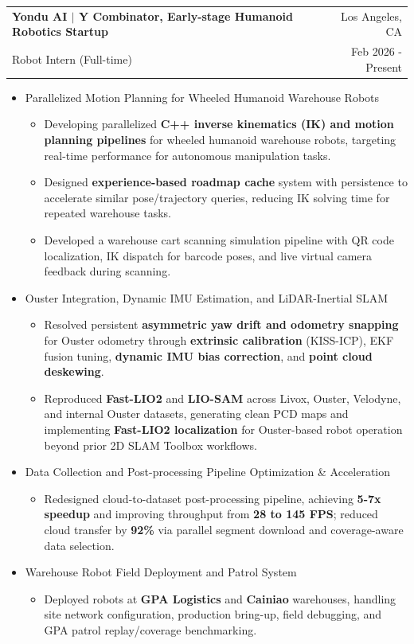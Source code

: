 \documentclass[a4paper,20pt]{article}
\makeatletter
\newcommand{\resumeResearchSubheadingShort}[4]{
  \vspace{4pt}\item
    \begin{tabular*} {0.98\textwidth} {@{\hspace{-0.5em}}l@{\extracolsep{\fill}}r@{}}
      \textbf{#1} & {#2}\null \\
      {#3} & {#4}
    \end{tabular*}
  \vspace{-6pt}
}
\newcommand{\resumeResearchItemListStart}{
  \begin{itemize} [leftmargin=*]
}
\newcommand{\resumeResearchItemListEnd}{
  \end{itemize}
  \vspace{-5pt}
}
\newcommand{\resumeResearchItem}[1]{
  \item{
    {#1 \vspace{-1pt}}
  }
}
\newcommand{\resumeResearchMidItemListStart}{
  \begin{itemize} [leftmargin=*]
}
\newcommand{\resumeResearchMidItemListEnd}{
  \end{itemize}
  \vspace{-8pt}
}
\newcommand{\resumeResearchMidItem}[2]{
  \item{
    \textbf{#1}
    {#2 \vspace{-2pt}}
  }
}
\makeatother
\begin{document}
\resumeResearchSubheadingShort
{Yondu AI \textnormal{\small{$|$ Y Combinator, Early-stage Humanoid Robotics Startup}}} {Los Angeles, CA}
{Robot Intern (Full-time)} {Feb 2026 - Present}
\resumeResearchMidItemListStart
\resumeResearchMidItem{}
{Parallelized Motion Planning for Wheeled Humanoid Warehouse Robots}
{
  \resumeResearchItemListStart
  \resumeResearchItem{}
  {Developing parallelized \textbf{C++ inverse kinematics (IK) and motion planning pipelines} for wheeled humanoid warehouse robots, targeting real-time performance for autonomous manipulation tasks.}
  \resumeResearchItem{}
  {Designed \textbf{experience-based roadmap cache} system with persistence to accelerate similar pose/trajectory queries, reducing IK solving time for repeated warehouse tasks.}
  \resumeResearchItem{}
  {Developed a warehouse cart scanning simulation pipeline with QR code         
  localization, IK dispatch for barcode poses, and live virtual camera feedback during scanning.}
  \resumeResearchItemListEnd
}
\resumeResearchMidItem{}
{Ouster Integration, Dynamic IMU Estimation, and LiDAR-Inertial SLAM}
{
  \resumeResearchItemListStart
  \resumeResearchItem{}
  {Resolved persistent \textbf{asymmetric yaw drift and odometry snapping} for Ouster odometry through \textbf{extrinsic calibration} (KISS-ICP), EKF fusion tuning, \textbf{dynamic IMU bias correction}, and \textbf{point cloud deskewing}.}
  \resumeResearchItem{}
  {Reproduced \textbf{Fast-LIO2} and \textbf{LIO-SAM} across Livox, Ouster, Velodyne, and internal Ouster datasets, generating clean PCD maps and implementing \textbf{Fast-LIO2 localization} for Ouster-based robot operation beyond prior 2D SLAM Toolbox workflows.}
  \resumeResearchItemListEnd
}
\resumeResearchMidItem{}
{Data Collection and Post-processing Pipeline Optimization \& Acceleration}
{
  \resumeResearchItemListStart
  \resumeResearchItem{} %
  {Redesigned cloud-to-dataset post-processing pipeline, achieving \textbf{5-7x speedup} and improving throughput from \textbf{28 to 145 FPS}; reduced cloud transfer by \textbf{92\%} via parallel segment download and coverage-aware data selection.}
  \resumeResearchItemListEnd
}
\resumeResearchMidItem{}
{Warehouse Robot Field Deployment and Patrol System}
{
  \resumeResearchItemListStart
  \resumeResearchItem{}
  {Deployed robots at \textbf{GPA Logistics} and \textbf{Cainiao} warehouses, handling site network configuration, production bring-up, field debugging, and GPA patrol replay/coverage benchmarking.}
  \resumeResearchItemListEnd
}
\resumeResearchMidItemListEnd
\end{document}
